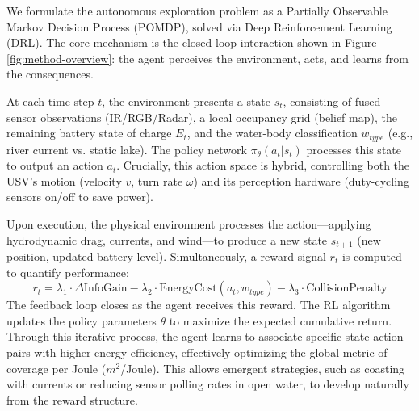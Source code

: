 We formulate the autonomous exploration problem as a Partially Observable Markov Decision Process (POMDP), solved via Deep Reinforcement Learning (DRL). The core mechanism is the closed-loop interaction shown in Figure \ref{fig:method-overview}: the agent perceives the environment, acts, and learns from the consequences.

At each time step $t$, the environment presents a state $s_t$, consisting of fused sensor observations (IR/RGB/Radar), a local occupancy grid (belief map), the remaining battery state of charge $E_t$, and the water-body classification $w_{type}$ (e.g., river current vs. static lake). The policy network $\pi_\theta(a_t|s_t)$ processes this state to output an action $a_t$. Crucially, this action space is hybrid, controlling both the USV's motion (velocity $v$, turn rate $\omega$) and its perception hardware (duty-cycling sensors on/off to save power).

Upon execution, the physical environment processes the action—applying hydrodynamic drag, currents, and wind—to produce a new state $s_{t+1}$ (new position, updated battery level). Simultaneously, a reward signal $r_t$ is computed to quantify performance:
\begin{equation}
    r_t = \lambda_1 \cdot \Delta \text{InfoGain} - \lambda_2 \cdot \text{EnergyCost}(a_t, w_{type}) - \lambda_3 \cdot \text{CollisionPenalty}
\end{equation}
The feedback loop closes as the agent receives this reward. The RL algorithm updates the policy parameters $\theta$ to maximize the expected cumulative return. Through this iterative process, the agent learns to associate specific state-action pairs with higher energy efficiency, effectively optimizing the global metric of coverage per Joule ($m^2$/Joule). This allows emergent strategies, such as coasting with currents or reducing sensor polling rates in open water, to develop naturally from the reward structure.

